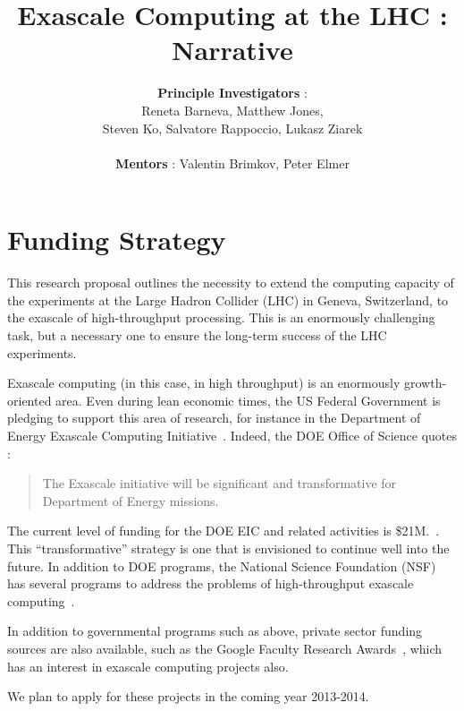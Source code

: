 \documentclass[12pt]{article}
\begin{document}
\title{Exascale Computing at the LHC : Narrative}
\author{{\bf Principle Investigators} : \\  
  Reneta Barneva, Matthew Jones, \\ 
  Steven Ko, Salvatore Rappoccio, Lukasz Ziarek \\ \\ 
  {\bf Mentors} : Valentin Brimkov, Peter Elmer}

\maketitle

\clearpage

\section{Funding Strategy}

This research proposal outlines the necessity to extend the computing
capacity of the experiments at the Large Hadron Collider (LHC) in
Geneva, Switzerland, to the exascale of high-throughput
processing. This is an enormously challenging task, but a necessary
one to ensure the long-term success of the LHC experiments. 

Exascale computing (in this case, in high throughput)
is an enormously growth-oriented area. Even during
lean economic times, the US Federal Government is pledging to support
this area of research, for instance in the Department of Energy
Exascale Computing Initiative~\cite{doe_eci}. Indeed, the DOE Office of
Science quotes :
\begin{quote}
The Exascale initiative will be significant and transformative for Department of Energy missions.
\end{quote}
The current level of funding for the DOE EIC and related activities is
\$21M.~\cite{doe_eci_budget}. This ``transformative'' strategy is one
that is envisioned to continue well into the future. 
In addition to DOE programs, the
National Science Foundation (NSF) has several programs to address the
problems of high-throughput exascale computing~\cite{nsf1,nsf2}.

In addition to governmental programs such as above, private sector
funding sources are also available, such as the Google Faculty
Research Awards~\cite{google_fac_awards}, which has an interest in
exascale computing projects also. 

We plan to apply for these projects in the coming year 2013-2014. 
\end{document}
